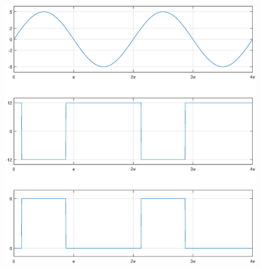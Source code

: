 \documentclass{article}
\begin{document}
\begin{figure}[H]
  \centering
  \includegraphics[width=\linewidth]{figures/Problem1081.eps}
\end{figure}
\end{document}
